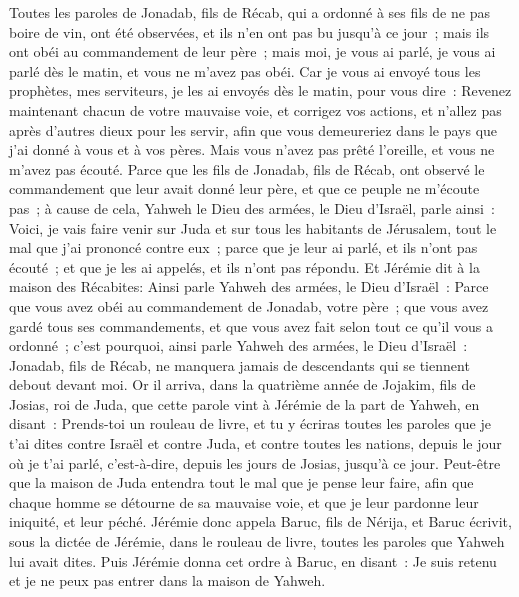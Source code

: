 \begin{multicols}{2}
Toutes les paroles de Jonadab, fils de Récab, qui a ordonné à ses fils de ne pas boire de vin, ont été observées, et ils n'en ont pas bu jusqu'à ce jour~; mais ils ont obéi au commandement de leur père~; mais moi, je vous ai parlé, je vous ai parlé dès le matin, et vous ne m'avez pas obéi.
Car je vous ai envoyé tous les prophètes, mes serviteurs, je les ai envoyés dès le matin, pour vous dire~: Revenez maintenant chacun de votre mauvaise voie, et corrigez vos actions, et n'allez pas après d'autres dieux pour les servir, afin que vous demeureriez dans le pays que j'ai donné à vous et à vos pères. Mais vous n'avez pas prêté l'oreille, et vous ne m'avez pas écouté.
Parce que les fils de Jonadab, fils de Récab, ont observé le commandement que leur avait donné leur père, et que ce peuple ne m'écoute pas~;
à cause de cela, Yahweh le Dieu des armées, le Dieu d'Israël, parle ainsi~: Voici, je vais faire venir sur Juda et sur tous les habitants de Jérusalem, tout le mal que j'ai prononcé contre eux~; parce que je leur ai parlé, et ils n'ont pas écouté~; et que je les ai appelés, et ils n'ont pas répondu.
Et Jérémie dit à la maison des Récabites: Ainsi parle Yahweh des armées, le Dieu d'Israël~: Parce que vous avez obéi au commandement de Jonadab, votre père~; que vous avez gardé tous ses commandements, et que vous avez fait selon tout ce qu'il vous a ordonné~;
c'est pourquoi, ainsi parle Yahweh des armées, le Dieu d'Israël~: Jonadab, fils de Récab, ne manquera jamais de descendants qui se tiennent debout devant moi.
\VerseOne{}Or il arriva, dans la quatrième année de Jojakim, fils de Josias, roi de Juda, que cette parole vint à Jérémie de la part de Yahweh, en disant~:
Prends-toi un rouleau de livre, et tu y écriras toutes les paroles que je t'ai dites contre Israël et contre Juda, et contre toutes les nations, depuis le jour où je t'ai parlé, c'est-à-dire, depuis les jours de Josias, jusqu'à ce jour.
Peut-être que la maison de Juda entendra tout le mal que je pense leur faire, afin que chaque homme se détourne de sa mauvaise voie, et que je leur pardonne leur iniquité, et leur péché.
Jérémie donc appela Baruc, fils de Nérija, et Baruc écrivit, sous la dictée de Jérémie, dans le rouleau de livre, toutes les paroles que Yahweh lui avait dites.
Puis Jérémie donna cet ordre à Baruc, en disant~: Je suis retenu et je ne peux pas entrer dans la maison de Yahweh.

\end{multicols}
